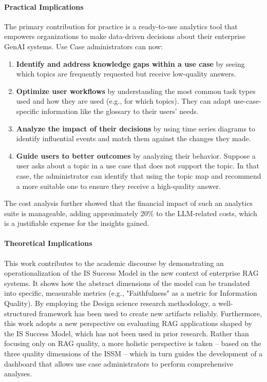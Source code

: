 \documentclass[
	english,
	ruledheaders=section,%
	class=report,%
	thesis={type=bachelor},%
	accentcolor=1b,%
	custommargins=true,%
	marginpar=false,%
	parskip=half-,%
	fontsize=11pt,%
	DIV=14,
]{tudapub}
\begin{document}
\paragraph{Practical Implications} The primary contribution for practice is a ready-to-use analytics tool that empowers organizations to make data-driven decisions about their enterprise GenAI systems. Use Case administrators can now:
\begin{enumerate}
    \item \textbf{Identify and address knowledge gaps within a use case} by seeing which topics are frequently requested but receive low-quality answers.
    \item \textbf{Optimize user workflows} by understanding the most common task types used and how they are used (e.g., for which topics). They can adapt use-case-specific information like the glossary to their users' needs.
    \item \textbf{Analyze the impact of their decisions} by using time series diagrams to identify influential events and match them against the changes they made.
    \item \textbf{Guide users to better outcomes} by analyzing their behavior. Suppose a user asks about a topic in a use case that does not support the topic. In that case, the administrator can identify that using the topic map and recommend a more suitable one to ensure they receive a high-quality answer.
\end{enumerate}
The cost analysis further showed that the financial impact of such an analytics suite is manageable, adding approximately 20\% to the LLM-related costs, which is a justifiable expense for the insights gained.

\paragraph{Theoretical Implications} This work contributes to the academic discourse by demonstrating an operationalization of the IS Success Model in the new context of enterprise RAG systems. It shows how the abstract dimensions of the model can be translated into specific, measurable metrics (e.g., "Faithfulness" as a metric for Information Quality). By employing the Design science research methodology, a well-structured framework has been used to create new artifacts reliably. Furthermore, this work adopts a new perspective on evaluating RAG applications shaped by the IS Success Model, which has not been used in prior research. Rather than focusing only on RAG quality, a more holistic perspective is taken -- based on the three quality dimensions of the ISSM -- which in turn guides the development of a dashboard that allows use case administrators to perform comprehensive analyses.
\end{document}
